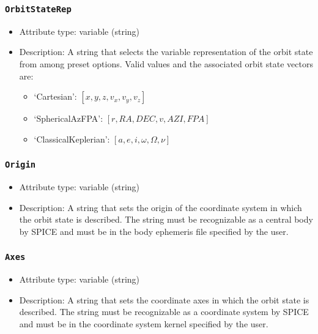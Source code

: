 \documentclass[]{article}
\begin{document}
\subsubsection{\texttt{OrbitStateRep}}
\label{sec:orbitstaterep}

\begin{itemize}
	\item Attribute type: variable (string)
	\item Description: A string that selects the variable representation of the orbit state from among preset options. Valid values and the associated orbit state vectors are:
	\begin{itemize}
		\item `Cartesian': $[x, y, z, v_x, v_y, v_z]$
		\item `SphericalAzFPA': $[r, RA, DEC, v, AZI, FPA]$
		\item `ClassicalKeplerian': $[a, e, i, \omega, \Omega, \nu]$
	\end{itemize}
\end{itemize}

\subsubsection{\texttt{Origin}}

\begin{itemize}
	\item Attribute type: variable (string)
	\item Description: A string that sets the origin of the coordinate system in which the orbit state is described. The string must be recognizable as a central body by SPICE and must be in the body ephemeris file specified by the user.
\end{itemize}

\subsubsection{\texttt{Axes}}

\begin{itemize}
	\item Attribute type: variable (string)
	\item Description: A string that sets the coordinate axes in which the orbit state is described. The string must be recognizable as a coordinate system by SPICE and must be in the coordinate system kernel specified by the user.
\end{itemize}
\end{document}
